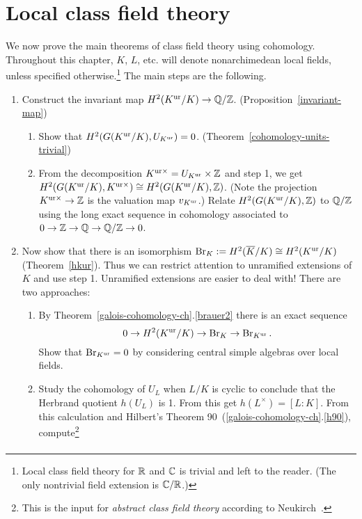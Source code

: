 \chapter{Local class field theory}
We now prove the main theorems of class field theory using cohomology. Throughout this chapter, $K$, $L$, etc. will denote nonarchimedean local fields, unless specified otherwise.\footnote{Local class field theory for $\mathbb{R}$ and $\mathbb{C}$ is trivial and left to the reader. (The only nontrivial field extension is $\mathbb{C}/\mathbb{R}$.)} The main steps are the following.
\begin{enumerate}
\item Construct the invariant map $H^2(K^{\text{ur}}/K)\to \mathbb{Q}/\mathbb{Z}$. (Proposition~\ref{invariant-map})
\begin{enumerate}
\item
Show that $H^2(G(K^{\text{ur}}/K),U_{K^{\text{ur}}})=0$. (Theorem~\ref{cohomology-units-trivial})
\item
From the decomposition $K^{\text{ur}\times}=U_{K^{\text{ur}}}\times \mathbb{Z}$ and step 1,  %
we get $H^2(G(K^{\text{ur}}/K),K^{\text{ur}\times})\cong H^2(G(K^{\text{ur}}/K),\mathbb{Z})$. (Note the projection $K^{\text{ur}\times}\to \mathbb{Z}$ is the valuation map $v_{K^{\text{ur}}}$.) Relate $H^2(G(K^{\text{ur}}/K),\mathbb{Z})$ to $\mathbb{Q}/\mathbb{Z}$ using the long exact sequence in cohomology associated to $0\to \mathbb{Z}\to \mathbb{Q}\to \mathbb{Q}/\mathbb{Z}\to 0$.
\end{enumerate}
\item Now show that there is an isomorphism $\operatorname{Br}_K:=H^2(\overline{K}/K)\cong H^2(K^{\text{ur}}/K)$ (Theorem~\ref{hkur}). Thus we can restrict attention to unramified extensions of $K$ and use step 1. Unramified extensions are easier to deal with! 
There are two approaches:
\begin{enumerate}
\item
By Theorem~\ref{galois-cohomology-ch}.\ref{brauer2} there is an exact sequence
\[
0\to H^2(K^{\text{ur}}/K)\to \operatorname{Br}_K\to \operatorname{Br}_{K^{\text{ur}}}.
\]
Show that $\operatorname{Br}_{K^{\text{ur}}}=0$ by considering central simple algebras over local fields.
\item
Study the cohomology of $U_L$ when $L/K$ is cyclic to conclude that the Herbrand quotient $h(U_L)$ is 1. From this get $h(L^{\times})=[L:K]$. From this calculation and Hilbert's Theorem 90~(\ref{galois-cohomology-ch}.\ref{h90}), compute\footnote{This is the input for {\it abstract class field theory} according to Neukirch~\cite{Ne99}.}
\begin{align*}

\end{align*}
\end{enumerate}
\end{enumerate}
